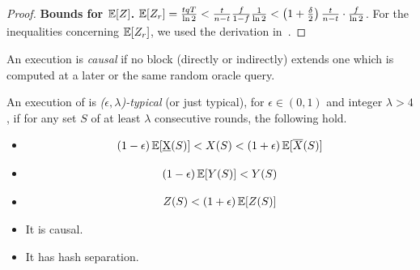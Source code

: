 \begin{proof}
  \noindent
  \textbf{Bounds for $\mathop{{}\mathbb{E}}[Z]$.}
  $\mathop{{}\mathbb{E}}[Z_r] = \frac{tqT}{\ln2} < \frac{t}{n - t}\frac{f}{1 - f}\frac{1}{\ln2} < \left(1 + \frac{\delta}{2}\right)\frac{t}{n - t} \cdot \frac{f}{\ln2}$. %
  For the inequalities concerning $\mathop{{}\mathbb{E}}[Z_r]$, we used the derivation in~\cite{backbone}.
\end{proof}

\begin{definition}[Causality]
  An execution is \emph{causal} if no block (directly or indirectly) extends
  one which is computed at a later or the same random oracle query.
\end{definition}

\begin{definition}\label{def:typicality}
  An execution of \poem is \emph{($\epsilon,\lambda$)-typical} (or just typical),
  for $\epsilon \in (0,1)$ and integer $\lambda > 4$, if for any set $S$ of at
  least $\lambda$ consecutive rounds, the following hold.
  \begin{itemize}
    \item
    \begin{minipage}{\linewidth}%
      \vspace{-\abovedisplayskip}%
      \begin{align}%
        (1 - \epsilon) \E[\underbar{X}(S)] < X(S) < (1 + \epsilon) \E[\overline{X}(S)] \label{eq.typical-x}%
      \end{align}%
    \end{minipage}

    \item
    \begin{minipage}{\linewidth}%
      \vspace{-\abovedisplayskip}%
      \begin{align}%
        (1 - \epsilon) \E[Y(S)] < Y(S) \label{eq.typical-y}%
      \end{align}%
    \end{minipage}

    \item
    \begin{minipage}{\linewidth}%
      \vspace{-\abovedisplayskip}%
      \begin{align}%
        Z(S) < (1 + \epsilon)\E[Z(S)] \label{eq.typical-z}%
      \end{align}%
    \end{minipage}

    \item It is causal.
    \item It has hash separation.
  \end{itemize}
\end{definition}

